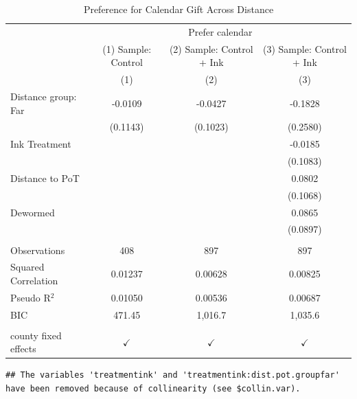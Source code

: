 \documentclass[
]{article}
\begin{document}
\begin{table}[htbp]
   \caption{Preference for Calendar Gift Across Distance}
   \bigskip
   \centering
   \begin{tabular}{lccc}
      \toprule
       & \multicolumn{3}{c}{Prefer calendar}\\
                           & (1) Sample: Control & (2) Sample: Control + Ink & (3) Sample: Control + Ink \\   
                           & (1)                 & (2)                       & (3)\\  
      \midrule 
      Distance group: Far  & -0.0109             & -0.0427                   & -0.1828\\   
                           & (0.1143)            & (0.1023)                  & (0.2580)\\   
      Ink Treatment        &                     &                           & -0.0185\\   
                           &                     &                           & (0.1083)\\   
      Distance to PoT      &                     &                           & 0.0802\\   
                           &                     &                           & (0.1068)\\   
      Dewormed             &                     &                           & 0.0865\\   
                           &                     &                           & (0.0897)\\   
       \\
      Observations         & 408                 & 897                       & 897\\  
      Squared Correlation  & 0.01237             & 0.00628                   & 0.00825\\  
      Pseudo R$^2$         & 0.01050             & 0.00536                   & 0.00687\\  
      BIC                  & 471.45              & 1,016.7                   & 1,035.6\\  
       \\
      county fixed effects & $\checkmark$        & $\checkmark$              & $\checkmark$\\   
      \bottomrule
   \end{tabular}
\end{table}

\begin{verbatim}
## The variables 'treatmentink' and 'treatmentink:dist.pot.groupfar' have been removed because of collinearity (see $collin.var).
\end{verbatim}
\end{document}
